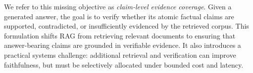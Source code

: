 We refer to this missing objective as \emph{claim-level evidence coverage}. Given a generated answer, the goal is to verify whether its atomic factual claims are supported, contradicted, or insufficiently evidenced by the retrieved corpus. This formulation shifts RAG from retrieving relevant documents to ensuring that answer-bearing claims are grounded in verifiable evidence. It also introduces a practical systems challenge: additional retrieval and verification can improve faithfulness, but must be selectively allocated under bounded cost and latency.


